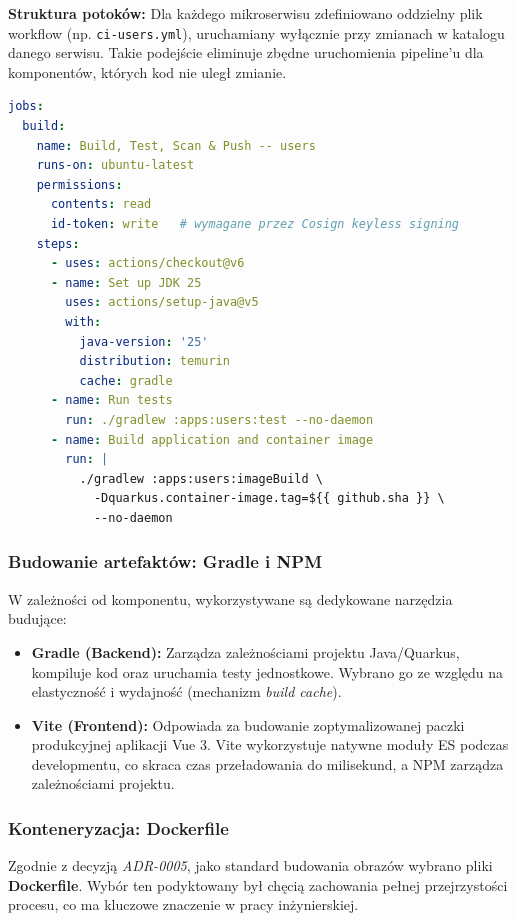 \textbf{Struktura potoków:}
Dla każdego mikroserwisu zdefiniowano oddzielny plik workflow (np. \texttt{ci-users.yml}), uruchamiany wyłącznie przy zmianach w katalogu danego serwisu. Takie podejście eliminuje zbędne uruchomienia pipeline'u dla komponentów, których kod nie uległ zmianie.

\begin{lstlisting}[language=yaml, caption={Fragment potoku CI -- budowanie i push obrazu natywnego (.github/workflows/ci-users.yml)}, label={lst:github-actions-build}]
jobs:
  build:
    name: Build, Test, Scan & Push -- users
    runs-on: ubuntu-latest
    permissions:
      contents: read
      id-token: write   # wymagane przez Cosign keyless signing
    steps:
      - uses: actions/checkout@v6
      - name: Set up JDK 25
        uses: actions/setup-java@v5
        with:
          java-version: '25'
          distribution: temurin
          cache: gradle
      - name: Run tests
        run: ./gradlew :apps:users:test --no-daemon
      - name: Build application and container image
        run: |
          ./gradlew :apps:users:imageBuild \
            -Dquarkus.container-image.tag=${{ github.sha }} \
            --no-daemon
\end{lstlisting}

\subsubsection{Budowanie artefaktów: Gradle i NPM}
W zależności od komponentu, wykorzystywane są dedykowane narzędzia budujące:
\begin{itemize}
    \item \textbf{Gradle (Backend):} Zarządza zależnościami projektu Java/Quarkus, kompiluje kod oraz uruchamia testy jednostkowe. Wybrano go ze względu na elastyczność i wydajność (mechanizm \textit{build cache}).
    \item \textbf{Vite (Frontend):} Odpowiada za budowanie zoptymalizowanej paczki produkcyjnej aplikacji Vue 3. Vite wykorzystuje natywne moduły ES podczas developmentu, co skraca czas przeładowania do milisekund, a NPM zarządza zależnościami projektu.
\end{itemize}

\subsubsection{Konteneryzacja: Dockerfile}
Zgodnie z decyzją \textit{ADR-0005}, jako standard budowania obrazów wybrano pliki \textbf{Dockerfile}. Wybór ten podyktowany był chęcią zachowania pełnej przejrzystości procesu, co ma kluczowe znaczenie w pracy inżynierskiej.

